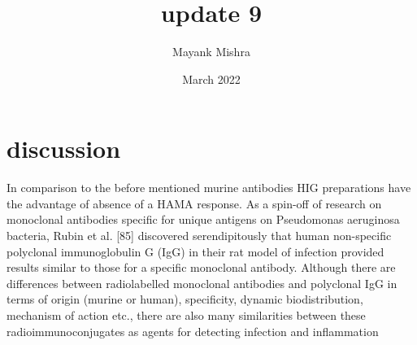 \documentclass{article}
\title{update 9}
\author{Mayank Mishra }
\date{March 2022}
\begin{document}
\maketitle

\section{discussion}
In comparison to the before mentioned murine antibodies
HIG preparations have the advantage of absence of a
HAMA response. As a spin-off of research on monoclonal
antibodies specific for unique antigens on Pseudomonas
aeruginosa bacteria, Rubin et al. [85] discovered
serendipitously that human non-specific polyclonal immunoglobulin
G (IgG) in their rat model of infection
provided results similar to those for a specific monoclonal
antibody. Although there are differences between radiolabelled
monoclonal antibodies and polyclonal IgG in
terms of origin (murine or human), specificity, dynamic
biodistribution, mechanism of action etc., there are also
many similarities between these radioimmunoconjugates
as agents for detecting infection and inflammation
\end{document}
